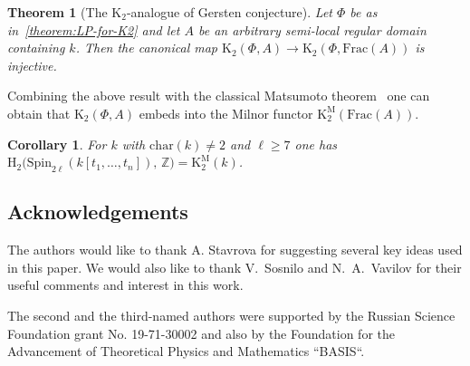 \documentclass[oneside, 11pt]{amsart} \pdfoutput=1
\newcommand{\K}{{\mathrm{K}}}
\numberwithin{equation}{section}
\newtheorem{theorem}[lemma]{Theorem}
\newtheorem{corollary}[lemma]{Corollary}
\theoremstyle{definition}
\begin{document}
\begin{theorem}[The $\K_2$-analogue of Gersten conjecture] \label{theorem:Gersten} Let $\Phi$ be as in~\cref{theorem:LP-for-K2} and let $A$ be an arbitrary semi-local regular domain containing $k$. Then the canonical map $\K_2(\Phi, A) \to \K_2(\Phi, \mathrm{Frac}(A))$ is injective. \end{theorem}

Combining the above result with the classical Matsumoto theorem~\cite[Theorem~5.10]{Ma69} one can obtain that $\K_2(\Phi, A)$ embeds into the Milnor functor $\K_2^\mathrm{M}(\mathrm{Frac}(A))$.

\begin{corollary}
For $k$ with $\mathrm{char}(k)\neq 2$ and $\ell \geq 7$ one has $\mathrm H_2(\mathrm{Spin}_{2\ell}(k[t_1,\ldots,t_n]),\,\mathbb Z\big) = \K^\mathrm{M}_2(k)$.
\end{corollary}


\subsection{Acknowledgements} The authors would like to thank A. Stavrova for suggesting several key ideas used in this paper. We would also like to thank V.~Sosnilo and N.~A.~Vavilov for their useful comments and interest in this work.

The second and the third-named authors were supported by the Russian Science Foundation grant No. 19-71-30002 and also by the Foundation for the Advancement of Theoretical Physics and Mathematics ``BASIS``.
\end{document}
